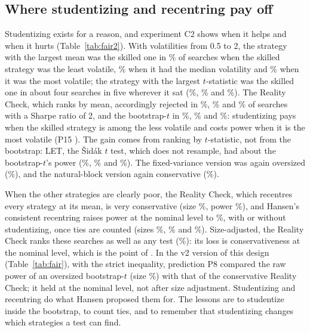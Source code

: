 \subsection{Where studentizing and recentring pay off}
\label{app:pay}
Studentizing exists for a reason, and experiment C2 shows when it helps and when it hurts (Table~\ref{tab:fair2}). With volatilities from 0.5 to 2, the strategy with the largest mean was the skilled one in \% of searches when the skilled strategy was the least volatile, \% when it had the median volatility and \% when it was the most volatile; the strategy with the largest $t$-statistic was the skilled one in about four searches in five wherever it sat (\%, \% and \%). The Reality Check, which ranks by mean, accordingly rejected in \%, \% and \% of searches with a Sharpe ratio of 2, and the bootstrap-$t$ in \%, \% and \%: studentizing pays when the skilled strategy is among the less volatile and costs power when it is the most volatile (P15 ). The gain comes from ranking by $t$-statistic, not from the bootstrap: LET, the \v{S}id\'ak $t$ test, which does not resample, had about the bootstrap-$t$'s power (\%, \% and \%). The fixed-variance version was again oversized (\%), and the natural-block version again conservative (\%).

When the other strategies are clearly poor, the Reality Check, which recentres every strategy at its mean, is very conservative (size \%, power \%), and Hansen's consistent recentring raises power at the nominal level to \%, with or without studentizing, once ties are counted (sizes \%, \% and \%). Size-adjusted, the Reality Check ranks these searches as well as any test (\%): its loss is conservativeness at the nominal level, which is the point of \citet{hansen2005spa}. In the v2 version of this design (Table~\ref{tab:fair}), with the strict inequality, prediction P8 compared the raw power of an oversized bootstrap-$t$ (size \%) with that of the conservative Reality Check; it held at the nominal level, not after size adjustment. Studentizing and recentring do what Hansen proposed them for. The lessons are to studentize inside the bootstrap, to count ties, and to remember that studentizing changes which strategies a test can find.
